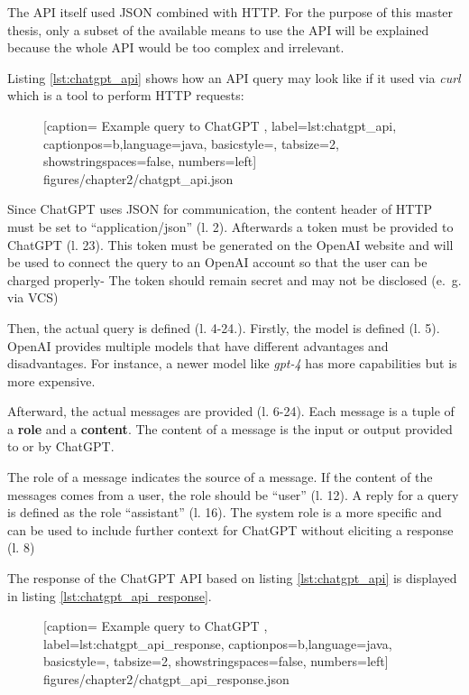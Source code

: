 The \ac{API} itself used JSON combined with \ac{HTTP}. For the purpose of this master thesis, only a subset of the available means to use the \ac{API} will be explained because the whole \ac{API} would be too complex and irrelevant. 

Listing \ref{lst:chatgpt_api} shows how an \ac{API} query may look like if it used via \textit{curl} which is a tool to  perform \ac{HTTP} requests:
 \begin{figure} [htbp!]
			
			[caption={ Example query to ChatGPT  \cite{ChatGPT_url}},
			label={lst:chatgpt_api},
			captionpos=b,language=java, basicstyle=\footnotesize, tabsize=2, showstringspaces=false,  numbers=left]
			{figures/chapter2/chatgpt_api.json}
		\end{figure}
 

Since ChatGPT uses \ac{JSON} for communication, the content header of \ac{HTTP}  must be set to \enquote{application/json} (l. 2). Afterwards a token must be provided to ChatGPT (l. 23). This  token must be generated on the OpenAI website and will be used to connect the query to an OpenAI account so that the user can be charged properly- The token should remain secret and may not be disclosed (e.~g. via \ac{VCS}) 

Then, the actual query is defined (l. 4-24.). Firstly, the model is defined (l. 5). OpenAI provides multiple models that have different advantages and disadvantages. For instance, a newer model like \textit{gpt-4} has more capabilities but is more expensive. 

Afterward, the actual messages are provided (l. 6-24). Each message is a tuple of a \textbf{role} and a \textbf{content}. The content of a message is the input or output provided to or by ChatGPT. 

The role of a message indicates the source of a message. If the content of the messages comes from a user, the role should be \enquote{user} (l. 12). A reply for a query is defined as the role \enquote{assistant} (l. 16). The system role is a more specific and can be used to include further context for ChatGPT without eliciting a response (l. 8)

The response of the ChatGPT \ac{API} based on listing \ref{lst:chatgpt_api} is displayed in listing \ref{lst:chatgpt_api_response}.
 \begin{figure} [htbp!]
			
			[caption={ Example query to ChatGPT  \cite{ChatGPT_url}},
			label={lst:chatgpt_api_response},
			captionpos=b,language=java, basicstyle=\footnotesize, tabsize=2, showstringspaces=false,  numbers=left]
			{figures/chapter2/chatgpt_api_response.json}
		\end{figure}

